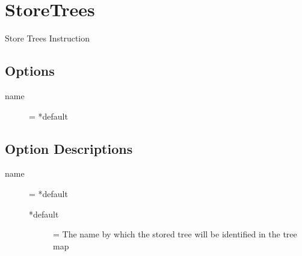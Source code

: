 \section{StoreTrees}

Store Trees Instruction

\subsection{Options}
\begin{description}
\item[name] = *default
\end{description}

\subsection{Option Descriptions}
\begin{description}
\item[name] = *default
	\begin{description}
	\item[*default] = The name by which the stored tree will be identified in the tree map
	\end{description}
\end{description}